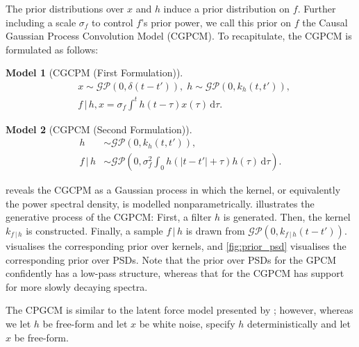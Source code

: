 \documentclass{article}
\newcommand{\id}[1]{\, \mathrm{d} #1}     %
\newcommand{\cond}{\, | \,}               %
\newtheorem{model}{Model}
\begin{document}
The prior distributions over $x$ and $h$ induce a prior distribution on $f$. Further including a scale $\sigma_f$ to control $f$'s prior power, we call this prior on $f$ the Causal Gaussian Process Convolution Model (CGPCM). To recapitulate, the CGPCM is formulated as follows:

\begin{model}[CGCPM (First Formulation)] \label{mod:cgpcm}
    \begin{align*}
        &x \sim \mathcal{GP}(0,\delta(t-t')), \;
        h \sim \mathcal{GP}(0, k_h(t,t')), \\
        &f\cond h, x = \sigma_f \int^t h(t- \tau)x(\tau)\id{\tau}.
    \end{align*}
\end{model}
\begin{model}[CGPCM (Second Formulation)] \label{mod:cgpcm2}
    \begin{align*}
        h &\sim \mathcal{GP}(0, k_h(t,t')), \\
        f \cond h &\sim \mathcal{GP}\left(0,  \sigma_f^2\int_0 h(|t-t'|+\tau)h(\tau)\id{\tau} \right).
    \end{align*}
\end{model}

 reveals the CGCPM as a Gaussian process in which the kernel, or equivalently the power spectral density, is modelled nonparametrically.  illustrates the generative process of the CGPCM: First, a filter $h$ is generated. Then, the kernel $k_{f\cond h}$ is constructed. Finally, a sample $f\cond h$ is drawn from $\mathcal{GP}(0,k_{f \cond h}(t-t'))$.  visualises the corresponding prior over kernels, and \cref{fig:prior_psd} visualises the corresponding prior over PSDs. Note that the prior over PSDs for the GPCM confidently has a low-pass structure, whereas that for the CGPCM has support for more slowly decaying spectra.

The CPGCM is similar to the latent force model presented by \citet{Alvarez:2009:Latent_Force_Models}; however, whereas we let $h$ be free-form and let $x$ be white noise, \citet{Alvarez:2009:Latent_Force_Models} specify $h$ deterministically and let $x$ be free-form.
\end{document}
